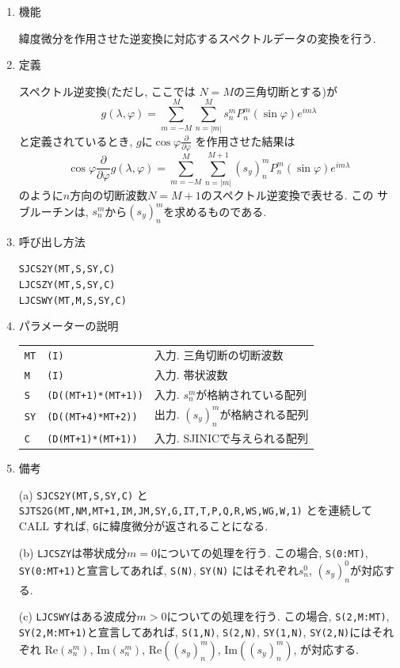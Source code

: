 \documentclass[a4j]{jarticle}
\newcommand{\re}{\mbox{Re}}
\newcommand{\im}{\mbox{Im}}
\begin{document}
\begin{enumerate}

\item 機能 

緯度微分を作用させた逆変換に対応するスペクトルデータの変換を行う.

\item 定義

スペクトル逆変換(ただし, ここでは $N=M$の三角切断とする)が
\begin{equation}
g(\lambda,\varphi)=\sum^M_{m=-M}\sum^M_{n=|m|}
s^m_nP^m_n(\sin\varphi)e^{im\lambda}
\end{equation}
と定義されているとき, $g$に$\cos\varphi\frac{\partial}{\partial\varphi}$
を作用させた結果は
\begin{equation}
\cos\varphi\frac{\partial}{\partial\varphi}
g(\lambda,\varphi)=\sum^M_{m=-M}\sum^{M+1}_{n=|m|}
(s_y)^m_nP^m_n(\sin\varphi)e^{im\lambda}
\end{equation}
のように$n$方向の切断波数$N=M+1$のスペクトル逆変換で表せる. この
サブルーチンは, $s^m_n$から$(s_y)^m_n$を求めるものである.

\item 呼び出し方法 

{\tt SJCS2Y(MT,S,SY,C)}\\
{\tt LJCSZY(MT,S,SY,C)}\\
{\tt LJCSWY(MT,M,S,SY,C)}
  
\item パラメーターの説明

\begin{tabular}{lll}
{\tt MT} & {\tt (I)} & 入力. 三角切断の切断波数\\
{\tt M} & {\tt (I)} & 入力. 帯状波数\\
{\tt S} & {\tt (D((MT+1)*(MT+1))} & 入力. $s^m_n$が格納されている配列\\
{\tt SY} & {\tt (D((MT+4)*MT+2))} & 出力. $(s_y)^m_n$が格納される配列\\
{\tt C} & {\tt (D(MT+1)*(MT+1))} & 入力. SJINICで与えられる配列
\end{tabular}

\item 備考

(a) {\tt SJCS2Y(MT,S,SY,C)} と 
    {\tt SJTS2G(MT,NM,MT+1,IM,JM,SY,G,IT,T,P,Q,R,WS,WG,W,1)}
    とを連続して CALL すれば, {\tt G}に緯度微分が返されることになる.

(b) {\tt LJCSZY}は帯状成分$m=0$についての処理を行う.
    この場合,
    {\tt S(0:MT)}, {\tt SY(0:MT+1)}と宣言してあれば, {\tt S(N)}, {\tt SY(N)}
    にはそれぞれ$s^0_n$, $(s_y)^0_n$が対応する.

(c) {\tt LJCSWY}はある波成分$m>0$についての処理を行う.
    この場合,
    {\tt S(2,M:MT)}, {\tt SY(2,M:MT+1)}と宣言してあれば, 
    {\tt S(1,N)}, {\tt S(2,N)}, {\tt SY(1,N)}, {\tt SY(2,N)}にはそれぞれ
    $\re(s^m_n)$, $\im(s^m_n)$, $\re((s_y)^m_n)$, $\im((s_y)^m_n)$, 
    が対応する.
    
\end{enumerate}
\end{document}
